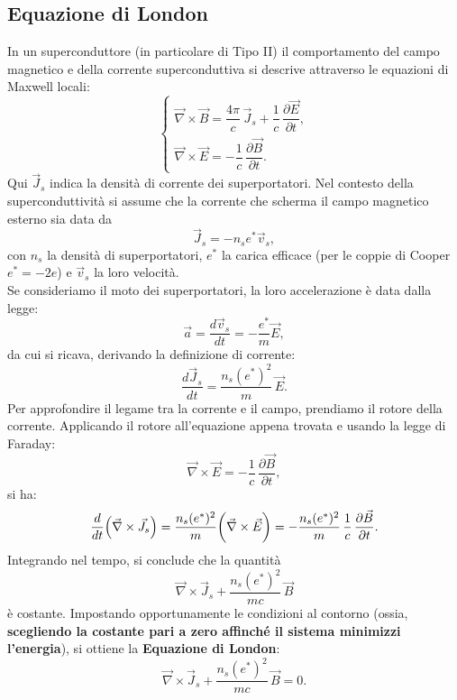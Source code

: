 \subsection{Equazione di London}
In un superconduttore (in particolare di Tipo II) il comportamento del campo magnetico e della corrente superconduttiva si descrive attraverso le equazioni di Maxwell locali:
\begin{equation}
    \begin{cases}
        \vec{\nabla} \times \vec{B} = \dfrac{4\pi}{c}\,\vec{J}_s + \dfrac{1}{c}\,\dfrac{\partial\vec{E}}{\partial t},\\[1mm]
        \vec{\nabla} \times \vec{E} = - \dfrac{1}{c}\,\dfrac{\partial \vec{B}}{\partial t}.
    \end{cases}
    \label{eqn:maxwell}
\end{equation}
Qui \(\vec{J}_s\) indica la densità di corrente dei superportatori. Nel contesto della superconduttività si assume che la corrente che scherma il campo magnetico esterno sia data da
\[
\vec{J}_s = - n_s e^* \vec{v}_s,
\]
con \(n_s\) la densità di superportatori, \(e^*\) la carica efficace (per le coppie di Cooper \(e^* = -2e\)) e \(\vec{v}_s\) la loro velocità.\\
Se consideriamo il moto dei superportatori, la loro accelerazione è data dalla legge:
\[
\vec{a} = \frac{d\vec{v}_s}{dt} = - \frac{e^*}{m} \vec{E},
\]
da cui si ricava, derivando la definizione di corrente:
\[
\frac{d\vec{J}_s}{dt} = \frac{n_s (e^*)^2}{m}\, \vec{E}.
\]
Per approfondire il legame tra la corrente e il campo, prendiamo il rotore della corrente. Applicando il rotore all'equazione appena trovata e usando la legge di Faraday:
\[
\vec{\nabla} \times \vec{E} = -\frac{1}{c}\,\frac{\partial \vec{B}}{\partial t},
\]
si ha:
\[
\frac{d}{dt} \Bigl(\vec{\nabla} \times \vec{J}_s\Bigr) = \frac{n_s (e^*)^2}{m} \biggl(\vec{\nabla} \times \vec{E}\biggr)
= - \frac{n_s (e^*)^2}{m}\,\frac{1}{c}\,\frac{\partial \vec{B}}{\partial t}.
\]
Integrando nel tempo, si conclude che la quantità
\[
\vec{\nabla} \times \vec{J}_s + \frac{n_s (e^*)^2}{mc}\, \vec{B}
\]
è costante. Impostando opportunamente le condizioni al contorno (ossia, \textbf{scegliendo la costante pari a zero affinché il sistema minimizzi l'energia}), si ottiene la \textbf{Equazione di London}:
\begin{equation}
    \vec{\nabla} \times \vec{J}_s + \frac{n_s (e^*)^2}{mc}\, \vec{B} = 0.
    \label{eqn:london1}
\end{equation}


